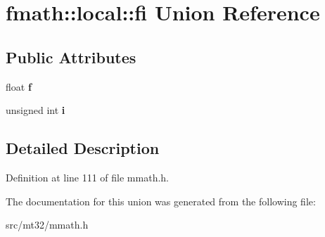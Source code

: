 \hypertarget{unionfmath_1_1local_1_1fi}{\section{fmath\-:\-:local\-:\-:fi Union Reference}
\label{unionfmath_1_1local_1_1fi}
}
\subsection*{Public Attributes}
\begin{DoxyCompactItemize}
\item 
\hypertarget{unionfmath_1_1local_1_1fi_a55615454f6872f8fbf6d3ab31f00e8f1}{float {\bfseries f}}\label{unionfmath_1_1local_1_1fi_a55615454f6872f8fbf6d3ab31f00e8f1}

\item 
\hypertarget{unionfmath_1_1local_1_1fi_a8b7e206a255d19ace89a2c4b993bd03e}{unsigned int {\bfseries i}}\label{unionfmath_1_1local_1_1fi_a8b7e206a255d19ace89a2c4b993bd03e}

\end{DoxyCompactItemize}


\subsection{Detailed Description}


Definition at line 111 of file mmath.\-h.



The documentation for this union was generated from the following file\-:\begin{DoxyCompactItemize}
\item 
src/mt32/mmath.\-h\end{DoxyCompactItemize}

